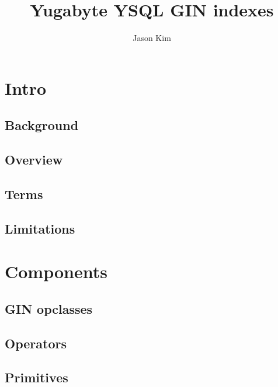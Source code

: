 \documentclass[11pt]{article}
\title{Yugabyte YSQL GIN indexes}
\author{
    Jason Kim
}
\begin{document}
\maketitle
\tableofcontents

\newpage
\hypertarget{intro}{%
\section{Intro}\label{intro}}

\hypertarget{background}{%
\subsection{Background}\label{background}}


\hypertarget{overview}{%
\subsection{Overview}\label{overview}}


\hypertarget{terms}{%
\subsection{Terms}\label{terms}}


\hypertarget{limitations}{%
\subsection{Limitations}\label{limitations}}


\newpage
\hypertarget{components}{%
\section{Components}\label{components}}

\hypertarget{gin-opclasses}{%
\subsection{GIN opclasses}\label{gin-opclasses}}


\hypertarget{operators}{%
\subsection{Operators}\label{operators}}


\hypertarget{primitives}{%
\subsection{Primitives}\label{primitives}}

\end{document}
